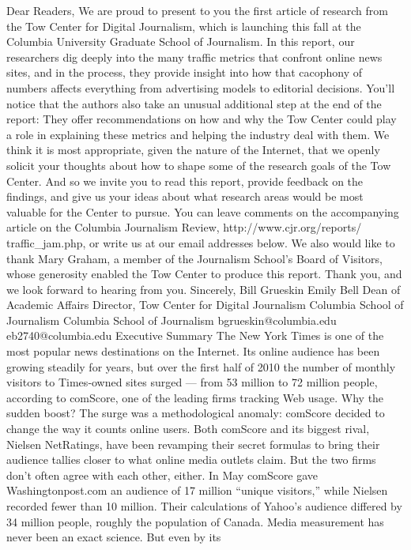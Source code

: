 Dear Readers,
We are proud to present to you the first article of research from the Tow Center
for Digital Journalism, which is launching this fall at the Columbia University
Graduate School of Journalism.
In this report, our researchers dig deeply into the many traffic metrics that
confront online news sites, and in the process, they provide insight into how that
cacophony of numbers affects everything from advertising models to editorial
decisions.
You’ll notice that the authors also take an unusual additional step at the end of
the report: They offer recommendations on how and why the Tow Center could
play a role in explaining these metrics and helping the industry deal with them.
We think it is most appropriate, given the nature of the Internet, that we openly
solicit your thoughts about how to shape some of the research goals of the Tow
Center. And so we invite you to read this report, provide feedback on the
findings, and give us your ideas about what research areas would be most
valuable for the Center to pursue. You can leave comments on the accompanying
article on the Columbia Journalism Review, http://www.cjr.org/reports/
traffic_jam.php, or write us at our email addresses below.
We also would like to thank Mary Graham, a member of the Journalism School’s
Board of Visitors, whose generosity enabled the Tow Center to produce this
report.
Thank you, and we look forward to hearing from you.
Sincerely,
Bill Grueskin Emily Bell
Dean of Academic Affairs Director, Tow Center for Digital Journalism
Columbia School of Journalism Columbia School of Journalism
bgrueskin@columbia.edu eb2740@columbia.edu
Executive Summary
The New York Times is one of the most popular news destinations on the
Internet. Its online audience has been growing steadily for years, but over
the first half of 2010 the number of monthly visitors to Times‐owned sites
surged — from 53 million to 72 million people, according to comScore,
one of the leading firms tracking Web usage.
Why the sudden boost? The surge was a methodological anomaly:
comScore decided to change the way it counts online users. Both
comScore and its biggest rival, Nielsen NetRatings, have been revamping
their secret formulas to bring their audience tallies closer to what online
media outlets claim. But the two firms don’t often agree with each other,
either. In May comScore gave Washingtonpost.com an audience of 17
million ``unique visitors,'' while Nielsen recorded fewer than 10 million.
Their calculations of Yahoo’s audience differed by 34 million people,
roughly the population of Canada.
Media measurement has never been an exact science. But even by its
